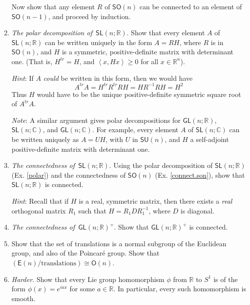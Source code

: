 \documentclass[12pt]{amsbook}
\theoremstyle{plain}
\numberwithin{equation}{chapter}
\numberwithin{theorem}{chapter}
\begin{document}
\begin{enumerate}
Now show that any element $R$ of $\mathsf{SO}(n)$ can be connected to an
element of $\mathsf{SO}(n-1)$, and proceed by induction.

\item \label{polar}\textit{The polar decomposition of}\emph{\ }$\mathsf{SL}%
\left(  n;\mathbb{R}\right)  $. Show that every element $A$ of $\mathsf{SL}%
\left(  n;\mathbb{R}\right)  $ can be written uniquely in the form $A=RH$,
where $R$ is in $\mathsf{SO}(n)$, and $H$ is a symmetric, positive-definite
matrix with determinant one. (That is, $H^{tr}=H$, and $\left\langle
x,Hx\right\rangle \geq0$ for all $x\in\mathbb{R}^{n}$).

\textit{Hint}: If $A$ \textit{could} be written in this form, then we would
have
\[
A^{tr}A=H^{tr}R^{tr}RH=HR^{-1}RH=H^{2}%
\]
Thus $H$ would have to be the unique positive-definite symmetric square root
of $A^{tr}A$.

\textit{Note}: A similar argument gives polar decompositions for
$\mathsf{GL}(n;\mathbb{R})$, $\mathsf{SL}\left(  n;\mathbb{C}\right)  $, and
$\mathsf{GL}(n;\mathbb{C})$. For example, every element $A$ of $\mathsf{SL}%
\left(  n;\mathbb{C}\right)  $ can be written uniquely as $A=UH$, with $U$ in
$\mathsf{SU}(n)$, and $H$ a self-adjoint positive-definite matrix with
determinant one.

\item \label{connect.sln}\textit{The connectedness of}\emph{\ }$\mathsf{SL}%
\left(  n;\mathbb{R}\right)  $. Using the polar decomposition of
$\mathsf{SL}\left(  n;\mathbb{R}\right)  $ (Ex. \ref{polar}) and the
connectedness of $\mathsf{SO}(n)$ (Ex. \ref{connect.son}), show that
$\mathsf{SL}\left(  n;\mathbb{R}\right)  $ is connected.

\textit{Hint}: Recall that if $H$ is a real, symmetric matrix, then there
exists a \textit{real} orthogonal matrix $R_{1}$ such that $H=R_{1}DR_{1}%
^{-1}$, where $D$ is diagonal.

\item \label{connect.gln}\textit{The connectedness of}\emph{\ }$\mathsf{GL}%
(n;\mathbb{R})^{+}$. Show that $\mathsf{GL}(n;\mathbb{R})^{+}$ is connected.

\item  Show that the set of translations is a normal subgroup of the Euclidean
group, and also of the Poincar\'{e} group. Show that $\left(  \mathsf{E}%
(n)/\mathrm{translations}\right)  \cong\mathsf{O}(n)$.

\item \label{character}\textit{Harder. }Show that every Lie group homomorphism
$\phi$ from $\mathbb{R}$ to $S^{1}$ is of the form $\phi(x)=e^{iax}$ for some
$a\in\mathbb{R}$. In particular, every such homomorphism is smooth.
\end{enumerate}
\end{document}
